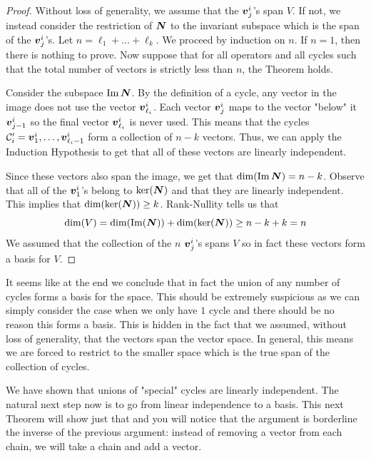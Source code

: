 \begin{proof}
    Without loss of generality, we assume that the $\boldsymbol{v}_j^i$'s span $V$. If not, we instead consider the restriction of $\boldsymbol{N}$ to the invariant subspace which is the span of the $\boldsymbol{v}_j^i$'s. Let $n=\ell_1+\dots+\ell_k$. We proceed by induction on $n$. If $n=1$, then there is nothing to prove. Now suppose that for all operators and all cycles such that the total number of vectors is strictly less than $n$, the Theorem holds.

    Consider the subspace $\operatorname{Im}\boldsymbol{N}$. By the definition of a cycle, any vector in the image does not use the vector $\boldsymbol{v}^i_{\ell_i}$. Each vector $\boldsymbol{v}^i_j$ maps to the vector "below" it $\boldsymbol{v}^i_{j-1}$ so the final vector $\boldsymbol{v}^i_{\ell_i}$ is never used. This means that the cycles $\mathcal{C}'_i=\boldsymbol{v}^i_1,\dots,\boldsymbol{v}^i_{\ell_{i}-1}$ form a collection of $n-k$ vectors. Thus, we can apply the Induction Hypothesis to get that all of these vectors are linearly independent. 
    
    Since these vectors also span the image, we get that $\dim(\operatorname{Im}\boldsymbol{N})=n-k$. Observe that all of the $\boldsymbol{v}_1^i$'s belong to $\ker(\boldsymbol{N})$ and that they are linearly independent. This implies that $\dim(\ker(\boldsymbol{N}))\geq k$. Rank-Nullity tells us that
    \[
    \dim(V)=\dim(\operatorname{Im}(\boldsymbol{N}))+\dim(\ker(\boldsymbol{N}))\geq n-k+k=n
    \]
    We assumed that the collection of the $n$ $\boldsymbol{v}^i_j$'s spans $V$ so in fact these vectors form a basis for $V$.
\end{proof}

\begin{remark}
    It seems like at the end we conclude that in fact the union of any number of cycles forms a basis for the space. This should be extremely suspicious as we can simply consider the case when we only have $1$ cycle and there should be no reason this forms a basis. This is hidden in the fact that we assumed, without loss of generality, that the vectors span the vector space. In general, this means we are forced to restrict to the smaller space which is the true span of the collection of cycles.
\end{remark}

We have shown that unions of "special" cycles are linearly independent. The natural next step now is to go from linear independence to a basis. This next Theorem will show just that and you will notice that the argument is borderline the inverse of the previous argument: instead of removing a vector from each chain, we will take a chain and add a vector.

